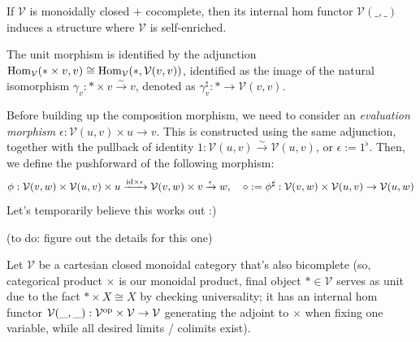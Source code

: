 \documentclass{article}
\begin{document}
\begin{exmp}
    If $\mathcal{V}$ is monoidally closed + cocomplete, then its internal hom functor $\mathcal{V}(\_,\_)$ induces a structure where $\mathcal{V}$ is self-enriched.

    The unit morphism is identified by the adjunction $\mathrm{Hom}_\mathcal{V}(*\times v,v)\cong \mathrm{Hom}_\mathcal{V}(*,\mathcal{V}(v,v))$, identified as the image of the natural isomorphism $\gamma_v:*\times v\xrightarrow{\sim}v$, denoted as $\gamma_v^\sharp:*\rightarrow\mathcal{V}(v,v)$. 

    Before building up the composition morphism, we need to consider an \emph{evaluation morphism} $\epsilon:\mathcal{V}(u,v)\times u\rightarrow v$. This is constructed using the same adjunction, together with the pullback of identity $1:\mathcal{V}(u,v)\xrightarrow{\sim}\mathcal{V}(u,v)$, or $\epsilon := 1^\flat$. Then, we define the pushforward of the following morphism:
    \[\phi:\mathcal{V}(v,w)\times \mathcal{V}(u,v)\times u\xrightarrow{\mathrm{id}\times \epsilon}\mathcal{V}(v,w)\times v\xrightarrow{\epsilon}w,\quad \circ := \phi^\sharp:\mathcal{V}(v,w)\times\mathcal{V}(u,v)\rightarrow \mathcal{V}(u,w)\]
    Let's temporarily believe this works out :)

    (to do: figure out the details for this one)
\end{exmp}

\hfil

Let $\mathcal{V}$ be a cartesian closed monoidal category that's also bicomplete (so, categorical product $\times$ is our monoidal product, final object $*\in\mathcal{V}$ serves as unit due to the fact $*\times X\cong X$ by checking universality; it has an internal hom functor $\mathcal{V}(\_,\_):\mathcal{V}^{\mathrm{op}}\times \mathcal{V}\rightarrow\mathcal{V}$ generating the adjoint to $\times$ when fixing one variable, while all desired limits / colimits exist).
\end{document}
